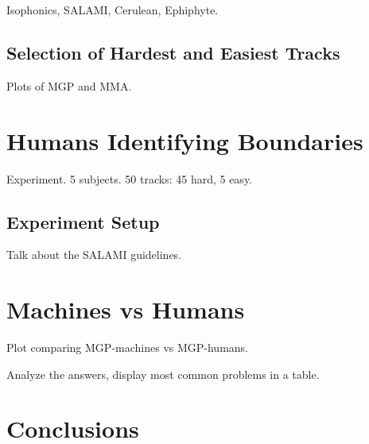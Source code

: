 \documentclass{article}
\begin{document}
Isophonics, SALAMI\cite{Smith2011}, Cerulean, Ephiphyte.

\subsection{Selection of Hardest and Easiest Tracks}

Plots of MGP and MMA.

\section{Humans Identifying Boundaries}\label{sec:using_method}

Experiment. 5 subjects. 50 tracks: 45 hard, 5 easy.

\subsection{Experiment Setup}

Talk about the SALAMI guidelines.

\section{Machines vs Humans}

Plot comparing MGP-machines vs MGP-humans.

Analyze the answers, display most common problems in a table.



\section{Conclusions}
\end{document}
